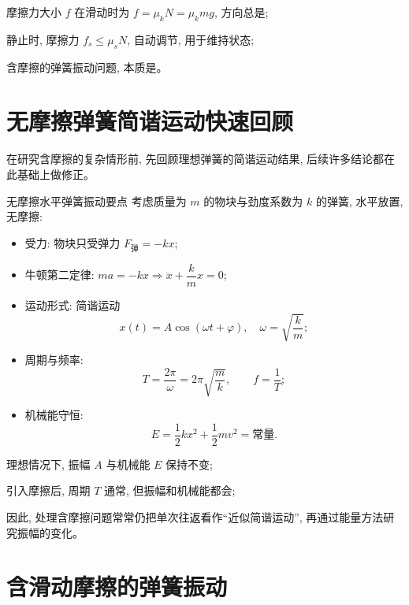 \documentclass[a4paper,11pt]{ctexart}
\begin{document}
\begin{focuspoints}
  \item 摩擦力大小 $f$ 在滑动时为 $f=\mu_k N=\mu_k mg$, 方向总是;
  \item 静止时, 摩擦力 $f_s\le \mu_s N$, 自动调节, 用于维持状态;
  \item 含摩擦的弹簧振动问题, 本质是。
\end{focuspoints}

\section{无摩擦弹簧简谐运动快速回顾}

在研究含摩擦的复杂情形前, 先回顾理想弹簧的简谐运动结果, 后续许多结论都在此基础上做修正。

\begin{summarybox}{无摩擦水平弹簧振动要点}
考虑质量为 $m$ 的物块与劲度系数为 $k$ 的弹簧, 水平放置, 无摩擦:
\begin{itemize}
  \item 受力: 物块只受弹力 $F_\text{弹}=-kx$;
  \item 牛顿第二定律: $ma=-kx\Rightarrow \ddot{x}+\dfrac{k}{m}x=0$;
  \item 运动形式: 简谐运动
  \[
    x(t)=A\cos(\omega t+\varphi),\quad \omega=\sqrt{\dfrac{k}{m}};
  \]
  \item 周期与频率:
  \[
    T=\dfrac{2\pi}{\omega}=2\pi\sqrt{\dfrac{m}{k}},\qquad f=\dfrac{1}{T};
  \]
  \item 机械能守恒:
  \[
    E=\dfrac{1}{2}kx^2+\dfrac{1}{2}mv^2=\text{常量}.
  \]
\end{itemize}
\end{summarybox}

\begin{focuspoints}
  \item 理想情况下, 振幅 $A$ 与机械能 $E$ 保持不变;
  \item 引入摩擦后, 周期 $T$ 通常, 但振幅和机械能都会;
  \item 因此, 处理含摩擦问题常常仍把单次往返看作“近似简谐运动”, 再通过能量方法研究振幅的变化。
\end{focuspoints}

\section{含滑动摩擦的弹簧振动}
\end{document}
